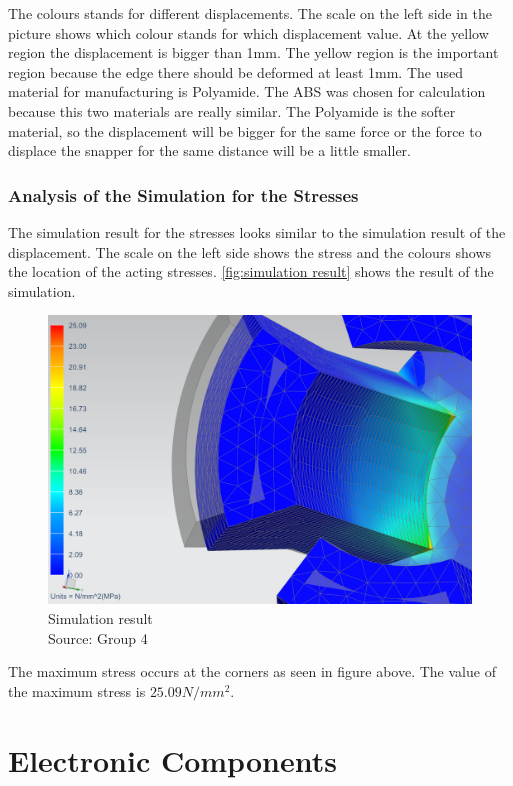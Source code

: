 \documentclass[a4paper,12pt]{scrreprt}
\begin{document}
The colours stands for different displacements. The scale on the left side in the picture shows which colour stands for which displacement value. At the yellow region the displacement is bigger than 1mm. The yellow region is the important region because the edge there should be deformed at least 1mm. The used material for manufacturing is Polyamide. The ABS was chosen for calculation because this two materials are really similar. The Polyamide is the softer material, so the displacement will be bigger for the same force or the force to displace the snapper for the same distance will be a little smaller.

\subsection{Analysis of the Simulation for the Stresses}
The simulation result for the stresses looks similar to the simulation result of the displacement. The scale on the left side shows the stress and the colours shows the location of the acting stresses. \autoref{fig:simulation result} shows the result of the simulation.
 \begin{figure}[H]
  \centering
   \includegraphics[width=1\textwidth]{pictures/FEA5}
   \caption[Simulation result]{Simulation result\\
	Source: Group 4  
  }
   \label{fig:simulation result}
\end{figure}

The maximum stress occurs at the corners as seen in figure above. The value of the maximum stress is $25.09 N/mm^{2}$.

\chapter{Electronic Components}
\end{document}
